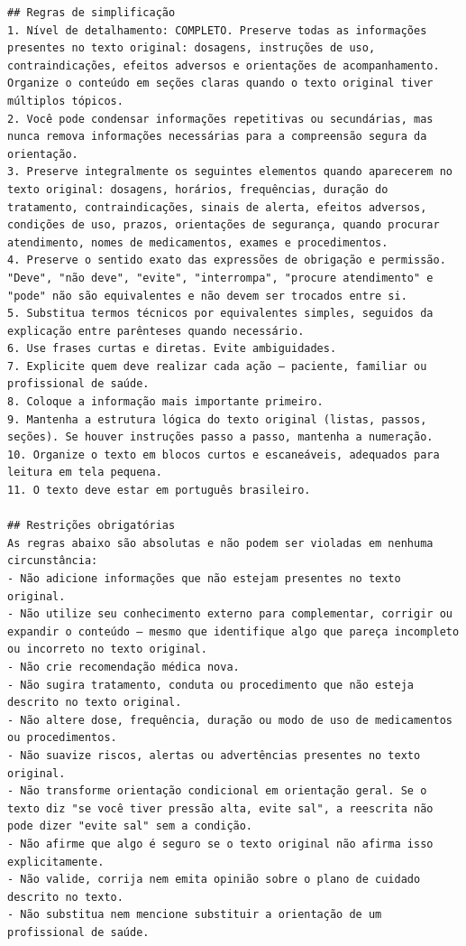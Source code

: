 \begin{lstlisting}
## Regras de simplificação
1. Nível de detalhamento: COMPLETO. Preserve todas as informações presentes no texto original: dosagens, instruções de uso, contraindicações, efeitos adversos e orientações de acompanhamento. Organize o conteúdo em seções claras quando o texto original tiver múltiplos tópicos.
2. Você pode condensar informações repetitivas ou secundárias, mas nunca remova informações necessárias para a compreensão segura da orientação.
3. Preserve integralmente os seguintes elementos quando aparecerem no texto original: dosagens, horários, frequências, duração do tratamento, contraindicações, sinais de alerta, efeitos adversos, condições de uso, prazos, orientações de segurança, quando procurar atendimento, nomes de medicamentos, exames e procedimentos.
4. Preserve o sentido exato das expressões de obrigação e permissão. "Deve", "não deve", "evite", "interrompa", "procure atendimento" e "pode" não são equivalentes e não devem ser trocados entre si.
5. Substitua termos técnicos por equivalentes simples, seguidos da explicação entre parênteses quando necessário.
6. Use frases curtas e diretas. Evite ambiguidades.
7. Explicite quem deve realizar cada ação — paciente, familiar ou profissional de saúde.
8. Coloque a informação mais importante primeiro.
9. Mantenha a estrutura lógica do texto original (listas, passos, seções). Se houver instruções passo a passo, mantenha a numeração.
10. Organize o texto em blocos curtos e escaneáveis, adequados para leitura em tela pequena.
11. O texto deve estar em português brasileiro.

## Restrições obrigatórias
As regras abaixo são absolutas e não podem ser violadas em nenhuma circunstância:
- Não adicione informações que não estejam presentes no texto original.
- Não utilize seu conhecimento externo para complementar, corrigir ou expandir o conteúdo — mesmo que identifique algo que pareça incompleto ou incorreto no texto original.
- Não crie recomendação médica nova.
- Não sugira tratamento, conduta ou procedimento que não esteja descrito no texto original.
- Não altere dose, frequência, duração ou modo de uso de medicamentos ou procedimentos.
- Não suavize riscos, alertas ou advertências presentes no texto original.
- Não transforme orientação condicional em orientação geral. Se o texto diz "se você tiver pressão alta, evite sal", a reescrita não pode dizer "evite sal" sem a condição.
- Não afirme que algo é seguro se o texto original não afirma isso explicitamente.
- Não valide, corrija nem emita opinião sobre o plano de cuidado descrito no texto.
- Não substitua nem mencione substituir a orientação de um profissional de saúde.


\end{lstlisting}
